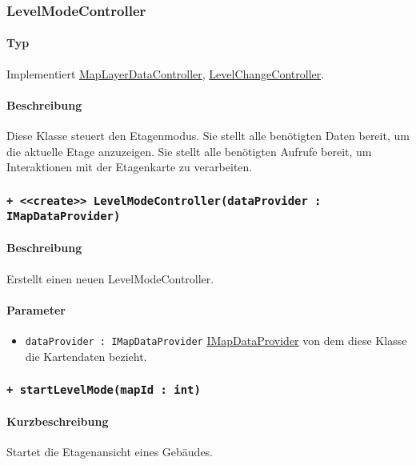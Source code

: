 \subsubsection{LevelModeController}\label{App_Map_ViewModel_LevelModeController}
\paragraph*{Typ}
Implementiert \hyperref[App_Map_ViewModel_MapLayerDataController]{MapLayerDataController}, \hyperref[App_Map_ViewModel_LevelChangeController]{LevelChangeController}.
\paragraph*{Beschreibung}
Diese Klasse steuert den Etagenmodus. Sie stellt alle benötigten Daten bereit, um die aktuelle Etage anzuzeigen. 
Sie stellt alle benötigten Aufrufe bereit, um Interaktionen mit der Etagenkarte zu verarbeiten.

\subsubsection*{\texttt{+ <<create>> LevelModeController(dataProvider : IMapDataProvider)}}\label{App_Map_ViewModel_createLevelModeController}%
\paragraph*{Beschreibung}
Erstellt einen neuen LevelModeController.
\paragraph*{Parameter}
\begin{itemize}
    \item \texttt{dataProvider : IMapDataProvider} \hyperref[App_Map_Model_IMapDataProvider]{IMapDataProvider} von dem diese Klasse die Kartendaten bezieht.
\end{itemize}

\subsubsection*{\texttt{+ startLevelMode(mapId : int)}}\label{App_Map_ViewModel_startLevelMode}%
\paragraph*{Kurzbeschreibung}
Startet die Etagenansicht eines Gebäudes.
